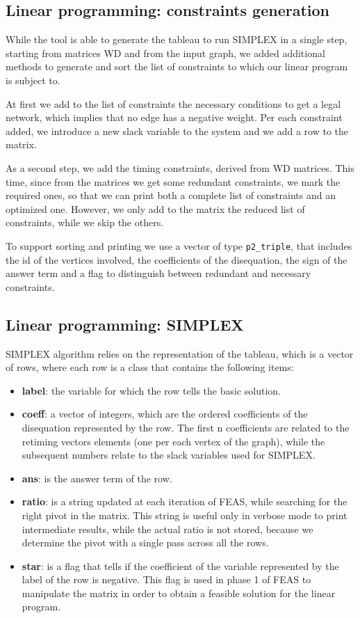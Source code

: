\documentclass{acm_proc_article-sp}
\begin{document}
\subsection{Linear programming: constraints generation}

While the tool is able to generate the tableau to run SIMPLEX in a single step,
starting from matrices WD and from the input graph, we added additional
methods to generate and sort the list of constraints to which our linear
program is subject to.

At first we add to the list of constraints the necessary conditions to get a
legal network, which implies that no edge has a negative weight.
Per each constraint added, we introduce a new slack variable to the system
and we add a row to the matrix.

As a second step, we add the timing constraints, derived from WD matrices.
This time, since from the matrices we get some redundant constraints, we
mark the required ones, so that we can print both a complete list of
constraints and an optimized one. However, we only add to the matrix the
reduced list of constraints, while we skip the others.

To support sorting and printing we use a vector of type \texttt{p2\_triple},
that includes the id of the vertices involved, the coefficients of the
disequation, the sign of the answer term and a flag to distinguish between
redundant and necessary constraints.

\subsection{Linear programming: SIMPLEX}

SIMPLEX algorithm relies on the representation of the tableau, which is a
vector of rows, where each row is a class that contains the following items:
\begin{itemize}
  \item {\bf label}: the variable for which the row tells the basic solution.
  \item {\bf coeff}: a vector of integers, which are the ordered coefficients
    of the disequation represented by the row. The first n coefficients are
    related to the retiming vectors elements (one per each vertex of the graph),
    while the subsequent numbers relate to the slack variables used for SIMPLEX.
  \item {\bf ans}: is the answer term of the row.
  \item {\bf ratio}: is a string updated at each iteration of FEAS, while
    searching for the right pivot in the matrix. This string is useful only
    in verbose mode to print intermediate results, while the actual ratio
    is not stored, because we determine the pivot with a single pass across all
    the rows.
  \item {\bf star}: is a flag that tells if the coefficient of the variable
    represented by the label of the row is negative. This flag is used in
    phase 1 of FEAS to manipulate the matrix in order to obtain a feasible
    solution for the linear program.
\end{itemize}
\end{document}
